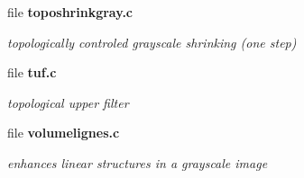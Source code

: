 \begin{CompactItemize}
\item 
file {\bf toposhrinkgray.c}
\begin{CompactList}\small\item\em topologically controled grayscale shrinking (one step) \item\end{CompactList}

\item 
file {\bf tuf.c}
\begin{CompactList}\small\item\em topological upper filter \item\end{CompactList}

\item 
file {\bf volumelignes.c}
\begin{CompactList}\small\item\em enhances linear structures in a grayscale image \item\end{CompactList}

\end{CompactItemize}
